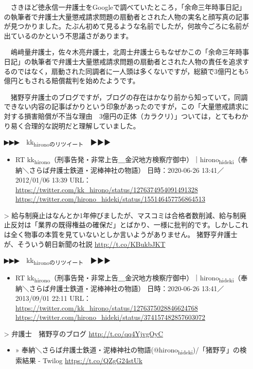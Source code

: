\documentclass[]{ltjarticle}
\begin{document}
　さきほど徳永信一弁護士をGoogleで調べていたところ，「余命三年時事日記」の執筆者で弁護士大量懲戒請求問題の扇動者とされた人物の実名と顔写真の記事が見つかりました。たぶん初めて見るような名前でしたが，何故今ごろに名前が出ているのかという不思議さがあります。

　嶋﨑量弁護士，佐々木亮弁護士，北周士弁護士らもなぜかこの「余命三年時事日記」の執筆者で弁護士大量懲戒請求問題の扇動者とされた人物の責任を追求するのではなく，扇動された同調者に一人頭は多くないですが，総額で3億円とも5億円ともされる賠償裁判を始めたようです。

　猪野亨弁護士のブログですが，ブログの存在はかなり前から知っていて，同調できない内容の記事ばかりという印象があったのですが，この「大量懲戒請求に対する損害賠償が不当な理由　3億円の正体（カラクリ）」ついては，とてもわかり易く合理的な説明だと理解していました。

▶▶▶　kk\textsubscript{hironoのリツイート}　▶▶▶  

\begin{itemize}
\item RT kk\textsubscript{hirono}（刑事告発・非常上告＿金沢地方検察庁御中）｜hirono\textsubscript{hideki}（奉納＼さらば弁護士鉄道・泥棒神社の物語） 日時：2020-06-26 13:41／2012/01/06 13:39 URL： \url{https://twitter.com/kk\_hirono/status/1276374954091491328} \url{https://twitter.com/hirono\_hideki/status/155146457756864513}
\end{itemize}

> 給与制廃止はなんとか1年伸びましたが、マスコミは合格者数削減、給与制廃止反対は「業界の既得権益の確保だ」とばかり、一様に批判的です。しかしこれは全く物事の本質を見ていないとしか言いようがありません。 猪野亨弁護士が、そういう朝日新聞の社説 \url{http://t.co/KBukbJKT}  

▶▶▶　kk\textsubscript{hironoのリツイート}　▶▶▶  

\begin{itemize}
\item RT kk\textsubscript{hirono}（刑事告発・非常上告＿金沢地方検察庁御中）｜hirono\textsubscript{hideki}（奉納＼さらば弁護士鉄道・泥棒神社の物語） 日時：2020-06-26 13:41／2013/09/01 22:11 URL： \url{https://twitter.com/kk\_hirono/status/1276375028846624768} \url{https://twitter.com/hirono\_hideki/status/374157482857603072}
\end{itemize}

> 弁護士　猪野亨のブログ \url{http://t.co/qq4YjvgOyC}  

\begin{itemize}
\item » 奉納＼さらば弁護士鉄道・泥棒神社の物語(@hirono\textsubscript{hideki})/「猪野亨」の検索結果 - Twilog \url{https://t.co/QZgG24stUk}
\end{itemize}
\end{document}

